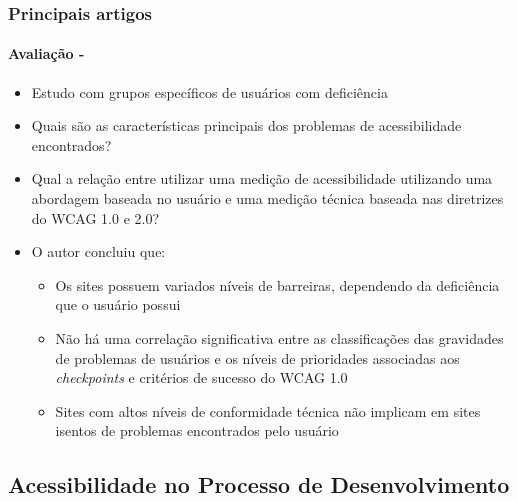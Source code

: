 \documentclass{beamer}
\begin{document}
\begin{frame}[allowframebreaks]
\frametitle{Principais artigos}
\framesubtitle{Avaliação - \citet{freire:12}}

\begin{itemize}
  \item Estudo com grupos específicos de usuários com deficiência
  \item Quais são as características principais dos problemas de acessibilidade encontrados?
  \item Qual a relação entre utilizar uma medição de acessibilidade utilizando uma abordagem
baseada no usuário e uma medição técnica baseada nas diretrizes do WCAG 1.0 e 2.0?
  \item O autor concluiu que:
  \begin{itemize}
   	\item Os sites possuem variados níveis de barreiras, dependendo da deficiência que o usuário possui
   	\item Não há uma correlação significativa entre as classificações das gravidades de problemas de usuários e os níveis de prioridades associadas aos \textit{checkpoints} e critérios de sucesso do WCAG 1.0
   	\item Sites com altos níveis de conformidade técnica não implicam em sites isentos de problemas encontrados pelo usuário
  \end{itemize}
\end{itemize}

\end{frame}


\subsection[MTA]{Acessibilidade no Processo de Desenvolvimento}
\end{document}
